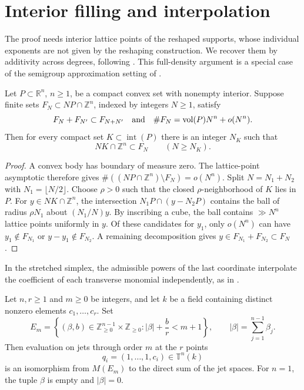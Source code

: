 \section{Interior filling and interpolation}\label{sec:interpolation}

The proof needs interior lattice points of the reshaped supports, whose individual exponents are not given by the reshaping construction. We recover them by additivity across degrees, following \cite[Lemma~5.1]{OpenAI2026Higher}. This full-density argument is a special case of the semigroup approximation setting of \textcite[Theorem~1.6]{KK12}.

\begin{lemma}\label{lem:interior-filling}
Let $P\subset\mathbb{R}^n$, $n\ge1$, be a compact convex set with nonempty interior. Suppose finite sets $F_N\subset NP\cap\mathbb{Z}^n$, indexed by integers $N\ge1$, satisfy
\[
 F_N+F_{N'}\subset F_{N+N'}
 \quad\text{and}\quad
 \#F_N=\operatorname{vol}(P)N^n+o(N^n).
\]
Then for every compact set $K\subset\operatorname{int}(P)$ there is an integer $N_K$ such that
\[
 NK\cap\mathbb{Z}^n\subset F_N\qquad(N\ge N_K).
\]
\end{lemma}

\begin{proof}
A convex body has boundary of measure zero. The lattice-point asymptotic therefore gives $\#((NP\cap\mathbb Z^n)\setminus F_N)=o(N^n)$. Split $N=N_1+N_2$ with $N_1=\lfloor N/2\rfloor$. Choose $\rho>0$ such that the closed $\rho$-neighborhood of $K$ lies in $P$. For $y\in NK\cap\mathbb Z^n$, the intersection $N_1P\cap(y-N_2P)$ contains the ball of radius $\rho N_1$ about $(N_1/N)y$. By inscribing a cube, the ball contains $\gg N^n$ lattice points uniformly in $y$. Of these candidates for $y_1$, only $o(N^n)$ can have $y_1\notin F_{N_1}$ or $y-y_1\notin F_{N_2}$. A remaining decomposition gives $y\in F_{N_1}+F_{N_2}\subset F_N$.
\end{proof}

In the stretched simplex, the admissible powers of the last coordinate interpolate the coefficient of each transverse monomial independently, as in \cite[Lemma~5.2]{OpenAI2026Higher}.

\begin{lemma}\label{lem:elongated-jets}
Let $n,r\ge1$ and $m\ge0$ be integers, and let $k$ be a field containing distinct nonzero elements $c_1,\ldots,c_r$.  Set
\begin{equation}\label{eq:interpolation-support}
 E_m=\left\{(\beta,b)\in\mathbb{Z}_{\ge0}^{n-1}\times\mathbb{Z}_{\ge0}:
          |\beta|+\frac br<m+1\right\},
 \qquad |\beta|=\sum_{j=1}^{n-1}\beta_j.
\end{equation}
Then evaluation on jets through order $m$ at the $r$ points
\[
 q_i=(1,\ldots,1,c_i)\in\mathbb{T}^n(k)
\]
is an isomorphism from $M(E_m)$ to the direct sum of the jet spaces. For $n=1$, the tuple $\beta$ is empty and $|\beta|=0$.
\end{lemma}

